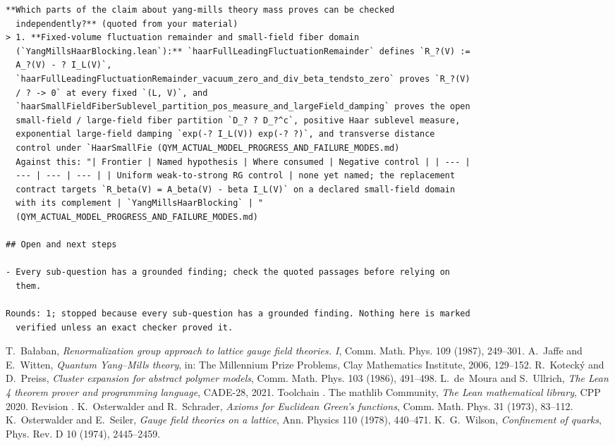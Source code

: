 \documentclass[11pt]{article}
\numberwithin{equation}{subsection}
\theoremstyle{plain}
\theoremstyle{definition}
\begin{document}
{\begin{verbatim}
**Which parts of the claim about yang-mills theory mass proves can be checked
  independently?** (quoted from your material)
> 1. **Fixed-volume fluctuation remainder and small-field fiber domain
  (`YangMillsHaarBlocking.lean`):** `haarFullLeadingFluctuationRemainder` defines `R_?(V) :=
  A_?(V) - ? I_L(V)`,
  `haarFullLeadingFluctuationRemainder_vacuum_zero_and_div_beta_tendsto_zero` proves `R_?(V)
  / ? -> 0` at every fixed `(L, V)`, and
  `haarSmallFieldFiberSublevel_partition_pos_measure_and_largeField_damping` proves the open
  small-field / large-field fiber partition `D_? ? D_?^c`, positive Haar sublevel measure,
  exponential large-field damping `exp(-? I_L(V)) exp(-? ?)`, and transverse distance
  control under `HaarSmallFie (QYM_ACTUAL_MODEL_PROGRESS_AND_FAILURE_MODES.md)
  Against this: "| Frontier | Named hypothesis | Where consumed | Negative control | | --- |
  --- | --- | --- | | Uniform weak-to-strong RG control | none yet named; the replacement
  contract targets `R_beta(V) = A_beta(V) - beta I_L(V)` on a declared small-field domain
  with its complement | `YangMillsHaarBlocking` | "
  (QYM_ACTUAL_MODEL_PROGRESS_AND_FAILURE_MODES.md)

## Open and next steps

- Every sub-question has a grounded finding; check the quoted passages before relying on
  them.

Rounds: 1; stopped because every sub-question has a grounded finding. Nothing here is marked
  verified unless an exact checker proved it.
\end{verbatim}}

\begin{thebibliography}{9}
 T.~Ba\l{}aban, \emph{Renormalization group approach to lattice gauge field
theories. I}, Comm. Math. Phys. 109 (1987), 249--301.
 A.~Jaffe and E.~Witten, \emph{Quantum Yang--Mills theory}, in: The
Millennium Prize Problems, Clay Mathematics Institute, 2006, 129--152.
 R.~Koteck\'y and D.~Preiss, \emph{Cluster expansion for abstract polymer
models}, Comm. Math. Phys. 103 (1986), 491--498.
 L.~de~Moura and S.~Ullrich, \emph{The Lean 4 theorem prover and programming
language}, CADE-28, 2021. Toolchain \texttt{\pkgtoolchain}.
 The mathlib Community, \emph{The Lean mathematical library}, CPP 2020.
Revision \pkgmathlibb.
 K.~Osterwalder and R.~Schrader, \emph{Axioms for Euclidean Green's
functions}, Comm. Math. Phys. 31 (1973), 83--112.
 K.~Osterwalder and E.~Seiler, \emph{Gauge field theories on a
lattice}, Ann. Physics 110 (1978), 440--471.
 K.~G.~Wilson, \emph{Confinement of quarks}, Phys. Rev. D 10 (1974), 2445--2459.
\end{thebibliography}
\end{document}
